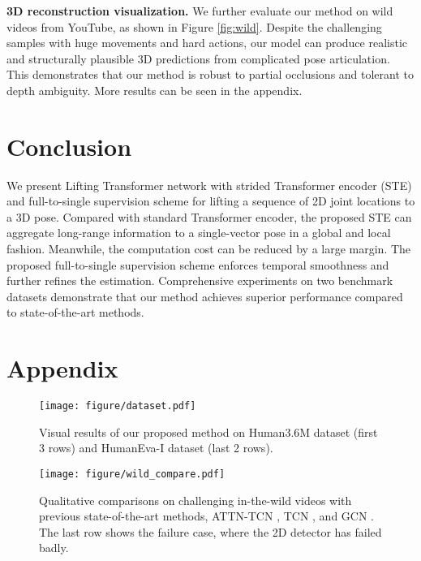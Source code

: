 \documentclass[10pt,twocolumn,letterpaper]{article}
\begin{document}
\textbf{3D reconstruction visualization. }
We further evaluate our method on wild videos from YouTube, as shown in Figure \ref{fig:wild}. 
Despite the challenging samples with huge movements and hard actions, our model can produce realistic and structurally plausible 3D predictions from complicated pose articulation. 
This demonstrates that our method is robust to partial occlusions and tolerant to depth ambiguity. 
More results can be seen in the appendix. 

\section{Conclusion} 
We present Lifting Transformer network with strided Transformer encoder (STE) and full-to-single supervision scheme for lifting a sequence of 2D joint locations to a 3D pose. 
Compared with standard Transformer encoder, the proposed STE can aggregate long-range information to a single-vector pose in a global and local fashion. Meanwhile, the computation cost can be reduced by a large margin. 
The proposed full-to-single supervision scheme enforces temporal smoothness and further refines the estimation. 
Comprehensive experiments on two benchmark datasets demonstrate that our method achieves superior performance compared to state-of-the-art methods. 

{\small


}

\section{Appendix}
\begin{figure*}[hb]
	\centering
	\texttt{[image: figure/dataset.pdf]}
	\caption
	{
    Visual results of our proposed method on Human3.6M dataset (first 3 rows) and HumanEva-I dataset (last 2 rows). 
	}
	\label{fig:dataset}
\end{figure*}

\begin{figure*}[hb]
	\centering
	\texttt{[image: figure/wild\_compare.pdf]}
	\caption
	{
    Qualitative comparisons on challenging in-the-wild videos with previous state-of-the-art methods, ATTN-TCN \cite{liu2020attention}, TCN \cite{pavllo20193d}, and GCN \cite{cai2019exploiting}. 
    The last row shows the failure case, where the 2D detector has failed badly. 
	}
	\label{fig:wild_compare}
\end{figure*}
\end{document}

